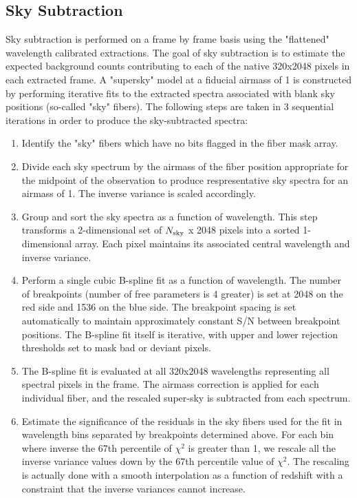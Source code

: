 \documentclass[12pt,preprint]{aastex}
\begin{document}
\subsection{Sky Subtraction}

Sky subtraction is performed on a frame by frame basis using the 
"flattened" wavelength calibrated extractions.  The goal of sky subtraction
is to estimate the expected background counts contributing to each of 
the native 320x2048 pixels in each extracted frame.  A "supersky" model 
at a fiducial airmass of 1 is constructed by performing iterative fits to
the extracted spectra associated with blank sky positions (so-called
"sky" fibers).   The following steps are taken in 3 sequential iterations
in order to produce the sky-subtracted spectra:

\begin{enumerate}

\item{Identify the "sky" fibers which have no bits flagged 
in the fiber mask array.}

\item{Divide each sky spectrum by the airmass of the fiber position appropriate
for the midpoint of the observation to produce respresentative sky spectra for 
an airmass of 1.  The inverse variance is scaled accordingly.}

\item{Group and sort the sky spectra as a function of wavelength.  This step
transforms a 2-dimensional set of $N_{\rm sky}$ x 2048 pixels into a sorted 1-dimensional array.  
Each pixel maintains its associated central wavelength and inverse variance. }

\item{Perform a single cubic B-spline fit as a function of wavelength.  
The number of breakpoints (number of free parameters is 4 greater) is set 
at 2048 on the red side and 1536 on the blue side.  The breakpoint spacing 
is set automatically to maintain approximately constant S/N between breakpoint 
positions. The B-spline fit itself is iterative, with upper and lower rejection 
thresholds set to mask bad or deviant pixels. }

\item{The B-spline fit is evaluated at all 320x2048 wavelengths representing all
spectral pixels in the frame.  The airmass correction is applied for each individual 
fiber, and the rescaled super-sky is subtracted from each spectrum.}

\item{Estimate the significance of the residuals in the sky fibers used for the
fit in wavelength bins separated by breakpoints determined above.  For each bin
where inverse the 67th percentile of $\chi^2$ is greater than 1, we rescale 
all the inverse variance values down by the 67th percentile value of $\chi^2$.
The rescaling is actually done with a smooth interpolation as a function of 
redshift with a constraint that the inverse variances cannot increase. }

\end{enumerate}
\end{document}
